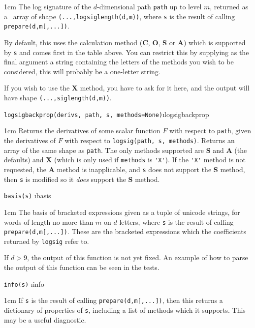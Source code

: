 \documentclass[a4paper]{extarticle}
\newenvironment{defn}{\begin{adjustwidth}{1cm}{}\ignorespaces}{\end{adjustwidth}\ignorespacesafterend}
\begin{document}
\begin{defn}
\nopagebreak The log signature of the $d$-dimensional path \verb|path| up to level $m$, returned as a \numpy\ array of shape \verb!(...,logsiglength(d,m))!, where \verb!s! is the result of calling \verb!prepare(d,m[,...])!.

By default, this uses the calculation method (\textbf{C}, \textbf{O}, \textbf{S} or \textbf{A}) which is supported by \verb|s| and comes first in the table above. You can restrict this by supplying as the final argument a string containing the letters of the methods you wish to be considered, this will probably be a one-letter string. 

If you wish to use the \textbf{X} method, you have to ask for it here, and the output will have shape \verb!(...,siglength(d,m))!.
\end{defn}
\verb!logsigbackprop(derivs, path, s, methods=None)!\i{logsigbackprop}

\begin{defn}
\nopagebreak Returns the derivatives of some scalar function $F$ with respect to \verb|path|, given %
the derivatives of $F$ with respect to \verb!logsig(path, s, methods)!. Returns an array of the same shape as \verb|path|. The only methods supported are \textbf{S} and \textbf{A} (the defaults) and \textbf{X} (which is only used if \verb|methods| is \verb|'X'|). If the \verb|'X'| method is not requested, the \textbf{A} method is inapplicable, and \verb|s| does not support the \textbf{S} method, then \verb|s| is modified so it \emph{does} support the \textbf{S} method.
\end{defn}

\verb!basis(s)! \i{basis}

\begin{defn}
\nopagebreak The basis of bracketed expressions given as a tuple of unicode strings, for words of length no more than $m$ on $d$ letters, where \verb!s! is the result of calling \verb!prepare(d,m[,...])!. These are the bracketed expressions which the coefficients returned by \verb|logsig| refer to.

If $d>9$, the output of this function is not yet fixed. An example of how to parse the output of this function can be seen in the tests.
\end{defn}

\verb!info(s)! \i{info}

\begin{defn}
	\nopagebreak If \verb!s! is the result of calling \verb!prepare(d,m[,...])!, then this returns a dictionary of properties of \verb|s|, including a list of methods which it supports. This may be a useful diagnostic.
\end{defn}
\end{document}

